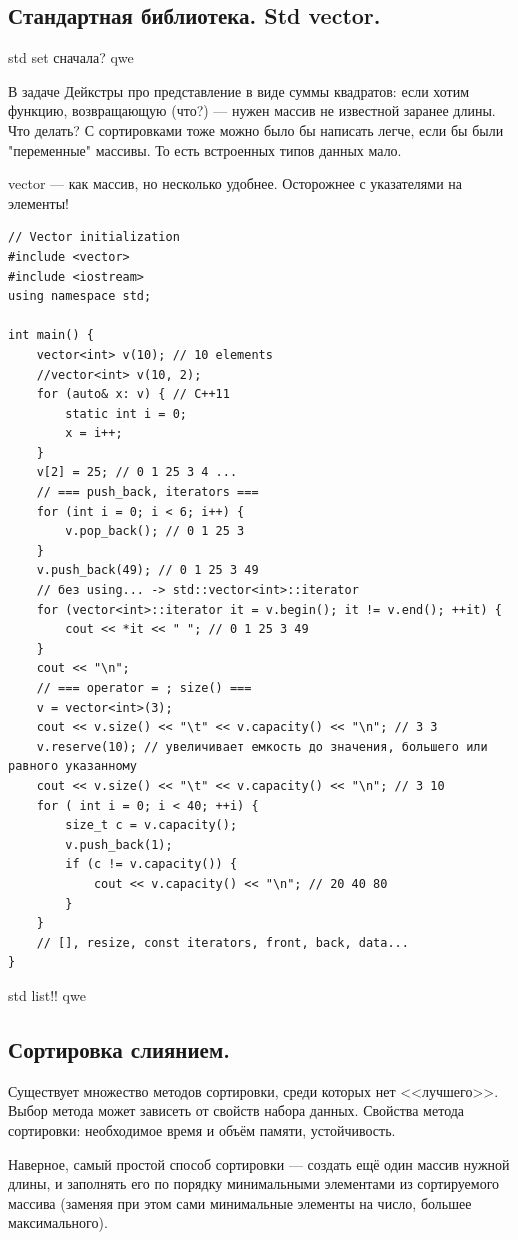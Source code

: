 \documentclass{book}
\begin{document}
\subsection{Стандартная библиотека. Std vector.}

std set сначала? qwe

В задаче Дейкстры про представление в виде суммы квадратов: если хотим функцию, возвращающую (что?)
--- нужен массив не известной заранее длины. Что делать? С сортировками тоже можно было бы написать
легче, если бы были "переменные" массивы. То есть встроенных типов данных мало.

vector --- как массив, но несколько удобнее. Осторожнее с указателями на элементы!
\begin{verbatim}
// Vector initialization
#include <vector>
#include <iostream>
using namespace std;

int main() {
    vector<int> v(10); // 10 elements
    //vector<int> v(10, 2);
    for (auto& x: v) { // C++11
        static int i = 0;
        x = i++;
    }
    v[2] = 25; // 0 1 25 3 4 ...
    // === push_back, iterators ===
    for (int i = 0; i < 6; i++) {
        v.pop_back(); // 0 1 25 3
    }
    v.push_back(49); // 0 1 25 3 49
    // без using... -> std::vector<int>::iterator
    for (vector<int>::iterator it = v.begin(); it != v.end(); ++it) {
        cout << *it << " "; // 0 1 25 3 49
    }
    cout << "\n";
    // === operator = ; size() ===
    v = vector<int>(3);
    cout << v.size() << "\t" << v.capacity() << "\n"; // 3 3
    v.reserve(10); // увеличивает емкость до значения, большего или равного указанному
    cout << v.size() << "\t" << v.capacity() << "\n"; // 3 10
    for ( int i = 0; i < 40; ++i) {
        size_t c = v.capacity();
        v.push_back(1);
        if (c != v.capacity()) {
            cout << v.capacity() << "\n"; // 20 40 80
        }
    }
    // [], resize, const iterators, front, back, data...
}
\end{verbatim}

std list!! qwe

\subsection{Сортировка слиянием.}

Существует множество методов сортировки, среди которых нет <<лучшего>>. Выбор
метода может зависеть от свойств набора данных. Свойства метода сортировки:
необходимое время и объём памяти, устойчивость.

Наверное, самый простой способ сортировки --- создать ещё один массив нужной длины, и заполнять его
по порядку минимальными элементами из сортируемого массива (заменяя при этом сами минимальные
элементы на число, большее максимального).
 
\end{document}
